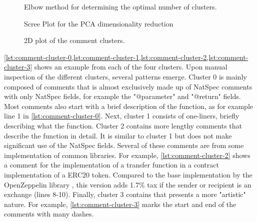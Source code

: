 
\begin{figure}[htbp]
    \centering
    
    \caption{Elbow method for determining the optimal number of clusters.}
    \label{fig:elbow}
\end{figure}

\begin{figure}[htbp]
    \centering
    
    \caption{Scree Plot for the PCA dimensionality reduction}
    \label{fig:scree-plot}
\end{figure}


\begin{figure}[htbp]
    \centering
    
    \caption{2D plot of the comment clusters.}
    \label{fig:comment-clusters}
\end{figure}

\cref{lst:comment-cluster-0,lst:comment-cluster-1,lst:comment-cluster-2,lst:comment-cluster-3} shows an example from each of the four clusters. Upon manual inspection of the different clusters, several patterns emerge. Cluster 0 is mainly composed of comments that is almost exclusively made up of NatSpec comments with only NatSpec fields, for example the "@parameter" and "@return" fields. Most comments also start with a brief description of the function, as for example line 1 in \cref{lst:comment-cluster-0}. Next, cluster 1 consists of one-liners, briefly describing what the function. Cluster 2 contains more lengthy comments that describe the function in detail. It is similar to cluster 1 but does not make significant use of the NatSpec fields. Several of these comments are from some implementation of common libraries. For example, \cref{lst:comment-cluster-2} shows a comment for the implementation of a transfer function in a contract implementation of a ERC20 token. Compared to the base implementation by the OpenZeppelin library \cite{openzeppelin}, this version adds 1.7\% tax if the sender or recipient is an exchange (lines 8-10). Finally, cluster 3 contains that presents a more "artistic" nature. For example, \cref{lst:comment-cluster-3} marks the start and end of the comments with many dashes.



